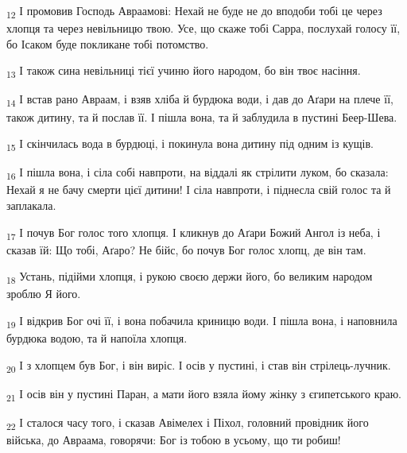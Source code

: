 \begin{tcolorbox}
\textsubscript{12} І промовив Господь Авраамові: Нехай не буде не до вподоби тобі це через хлопця та через невільницю твою. Усе, що скаже тобі Сарра, послухай голосу її, бо Ісаком буде покликане тобі потомство.
\end{tcolorbox}
\begin{tcolorbox}
\textsubscript{13} І також сина невільниці тієї учиню його народом, бо він твоє насіння.
\end{tcolorbox}
\begin{tcolorbox}
\textsubscript{14} І встав рано Авраам, і взяв хліба й бурдюка води, і дав до Аґари на плече її, також дитину, та й послав її. І пішла вона, та й заблудила в пустині Беер-Шева.
\end{tcolorbox}
\begin{tcolorbox}
\textsubscript{15} І скінчилась вода в бурдюці, і покинула вона дитину під одним із кущів.
\end{tcolorbox}
\begin{tcolorbox}
\textsubscript{16} І пішла вона, і сіла собі навпроти, на віддалі як стрілити луком, бо сказала: Нехай я не бачу смерти цієї дитини! І сіла навпроти, і піднесла свій голос та й заплакала.
\end{tcolorbox}
\begin{tcolorbox}
\textsubscript{17} І почув Бог голос того хлопця. І кликнув до Аґари Божий Ангол із неба, і сказав їй: Що тобі, Аґаро? Не бійс, бо почув Бог голос хлопц, де він там.
\end{tcolorbox}
\begin{tcolorbox}
\textsubscript{18} Устань, підійми хлопця, і рукою своєю держи його, бо великим народом зроблю Я його.
\end{tcolorbox}
\begin{tcolorbox}
\textsubscript{19} І відкрив Бог очі її, і вона побачила криницю води. І пішла вона, і наповнила бурдюка водою, та й напоїла хлопця.
\end{tcolorbox}
\begin{tcolorbox}
\textsubscript{20} І з хлопцем був Бог, і він виріс. І осів у пустині, і став він стрілець-лучник.
\end{tcolorbox}
\begin{tcolorbox}
\textsubscript{21} І осів він у пустині Паран, а мати його взяла йому жінку з єгипетського краю.
\end{tcolorbox}
\begin{tcolorbox}
\textsubscript{22} І сталося часу того, і сказав Авімелех і Піхол, головний провідник його війська, до Авраама, говорячи: Бог із тобою в усьому, що ти робиш!
\end{tcolorbox}

